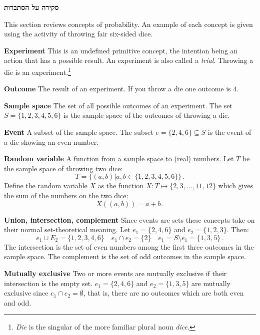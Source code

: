 

\newpage

\begin{center}
\textbf{\LARGE סקירה על הסתברות}
\end{center}

This section reviews concepts of probability. An example of each concept is given using the activity of throwing fair six-sided dice.

\textbf{Experiment} This is an undefined primitive concept, the intention being an action that has a possible result. An experiment is also called a \emph{trial}. Throwing a die is an experiment.\footnote{\emph{Die} is the singular of the more familiar plural noun \emph{dice}.}

\textbf{Outcome} The result of an experiment. If you throw a die one outcome is $4$.

\textbf{Sample space} The set of all possible outcomes of an experiment. The set $S=\{1,2,3,4,5,6\}$ is the sample space of the outcomes of throwing a die.

\textbf{Event} A subset of the sample space. The subset $e=\{2,4,6\}\subseteq S$ is the event of a die showing an even number.

\textbf{Random variable} A function from a sample space to (real) numbers. Let $T$ be the sample space of throwing two dice:
\[
T=\{(a,b)| a,b\in \{1,2,3,4,5,6\} \}\,.
\]
Define the random variable $X$ as the function $X:T \mapsto \{2,3,\ldots,11,12\}$ which gives the sum of the numbers on the two dice:
\begin{equation}\label{eq.sum}
X((a,b)) = a+b\,.
\end{equation}

\textbf{Union, intersection, complement} Since events are sets these concepts take on their normal set-theoretical meaning. Let  $e_1=\{2,4,6\}$ and $e_2=\{1,2,3\}$. Then:
\[
e_1 \cup E_2=\{1,2,3,4,6\}\quad e_1 \cap e_2=\{2\}\quad \overline{e_1} = S\setminus e_1=\{1,3,5\}\,.
\]
The intersection is the set of even numbers among the first three outcomes in the sample space. The complement is the set of odd outcomes in the sample space.

\textbf{Mutually exclusive} Two or more events are mutually exclusive if their intersection is the empty set. $e_1=\{2,4,6\}$ and $e_2=\{1,3,5\}$ are mutually exclusive since $e_1 \cap e_2=\emptyset$, that is, there are no outcomes which are both even and odd.

